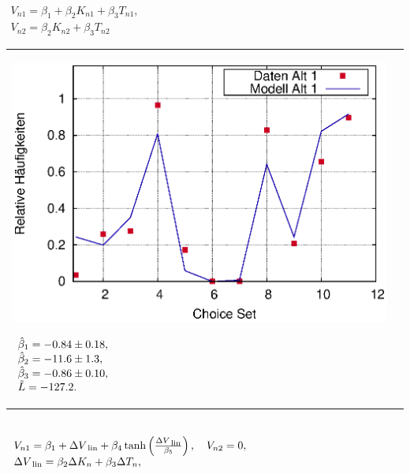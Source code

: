 \documentclass[a4paper]{foils}
\begin{document}
\begin{landscape}
\begin{center}
\newpage
\\[3ex]

$
\begin{array}{l}
V_{n1}=\beta_1+\beta_2 K_{n1}+\beta_3 T_{n1},\\ 
V_{n2}=\beta_2 K_{n2}+\beta_3 T_{n2}
\end{array}
$

\vspace{3ex}

\begin{tabular}{ll}
\parbox{1.00\textwidth}{
\includegraphics[width=1.0\textwidth]{figsDiscr/nonlinUtility_statedChoiceWS1213_restr_fProb.eps}
}
\parbox{0.30\textwidth}{
 {\small
 $
 \begin{array}{l}
\hat{\beta}_1=-0.84 \pm 0.18, \\
\hat{\beta}_2=-11.6 \pm 1.3, \\
\hat{\beta}_3=-0.86 \pm 0.10, \\
\tilde{L}=-127.2.
 \end{array}
 $
}}
\end{tabular}


\newpage
\\[3ex]

$
\begin{array}{l}
V_{n1}=\beta_1 +\Delta V_{{\mbox{ {\scriptsize \hspace{-0.2ex}lin}}}}
+\beta_4 \tanh\left(\frac{\Delta  V_{{\mbox{ {\scriptsize \hspace{-0.2ex}lin}}}}}{\beta_5}\right),\quad
V_{n2}=0, \\
\Delta V_{{\mbox{ {\scriptsize \hspace{-0.2ex}lin}}}}=\beta_2 \Delta K_n+\beta_3\Delta T_n,
\end{array}
$



\end{center}
\end{landscape}
\end{document}
